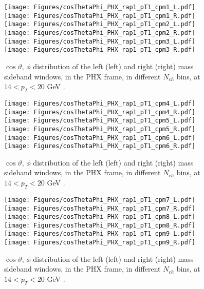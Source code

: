 \documentclass[12pt]{article}
\begin{document}

\begin{figure}[htbp]
\centering
\texttt{[image: Figures/cosThetaPhi\_PHX\_rap1\_pT1\_cpm1\_L.pdf]}
\texttt{[image: Figures/cosThetaPhi\_PHX\_rap1\_pT1\_cpm1\_R.pdf]}
\texttt{[image: Figures/cosThetaPhi\_PHX\_rap1\_pT1\_cpm2\_L.pdf]}
\texttt{[image: Figures/cosThetaPhi\_PHX\_rap1\_pT1\_cpm2\_R.pdf]}
\texttt{[image: Figures/cosThetaPhi\_PHX\_rap1\_pT1\_cpm3\_L.pdf]}
\texttt{[image: Figures/cosThetaPhi\_PHX\_rap1\_pT1\_cpm3\_R.pdf]}
\caption{$\cos\vartheta,\,\phi$ distribution of the left (left) and
  right (right) mass sideband windows, in the PHX frame, in different
  $N_{ch}$ bins, at $14 < p_{T} < 20$ GeV .}
\end{figure}
\clearpage

\begin{figure}[htbp]
\centering
\texttt{[image: Figures/cosThetaPhi\_PHX\_rap1\_pT1\_cpm4\_L.pdf]}
\texttt{[image: Figures/cosThetaPhi\_PHX\_rap1\_pT1\_cpm4\_R.pdf]}
\texttt{[image: Figures/cosThetaPhi\_PHX\_rap1\_pT1\_cpm5\_L.pdf]}
\texttt{[image: Figures/cosThetaPhi\_PHX\_rap1\_pT1\_cpm5\_R.pdf]}
\texttt{[image: Figures/cosThetaPhi\_PHX\_rap1\_pT1\_cpm6\_L.pdf]}
\texttt{[image: Figures/cosThetaPhi\_PHX\_rap1\_pT1\_cpm6\_R.pdf]}
\caption{$\cos\vartheta,\,\phi$ distribution of the left (left) and
  right (right) mass sideband windows, in the PHX frame, in different
  $N_{ch}$ bins, at $14 < p_{T} < 20$ GeV .}
\end{figure}
\clearpage

\begin{figure}[htbp]
\centering
\texttt{[image: Figures/cosThetaPhi\_PHX\_rap1\_pT1\_cpm7\_L.pdf]}
\texttt{[image: Figures/cosThetaPhi\_PHX\_rap1\_pT1\_cpm7\_R.pdf]}
\texttt{[image: Figures/cosThetaPhi\_PHX\_rap1\_pT1\_cpm8\_L.pdf]}
\texttt{[image: Figures/cosThetaPhi\_PHX\_rap1\_pT1\_cpm8\_R.pdf]}
\texttt{[image: Figures/cosThetaPhi\_PHX\_rap1\_pT1\_cpm9\_L.pdf]}
\texttt{[image: Figures/cosThetaPhi\_PHX\_rap1\_pT1\_cpm9\_R.pdf]}
\caption{$\cos\vartheta,\,\phi$ distribution of the left (left) and
  right (right) mass sideband windows, in the PHX frame, in different
  $N_{ch}$ bins, at $14 < p_{T} < 20$ GeV .}
\end{figure}
\clearpage
\end{document}
